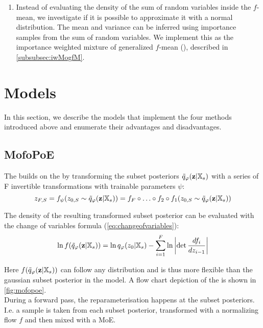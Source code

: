 \begin{enumerate}
    \item Instead of evaluating the density of the sum of random variables inside the $f$-mean, we investigate if it is possible to approximate it with a normal distribution.
    The mean and variance can be inferred using importance samples from the sum of random variables.
    We implement this as the importance weighted mixture of generalized $f$-mean (), described in \cref{subsubsec:iwMogfM}.

\end{enumerate}


\section{Models}
In this section, we describe the models that implement the four methods introduced above and enumerate their advantages and disadvantages.

\subsection{MofoPoE}\label{subsec:mofopoe}
The  builds on the  by transforming the subset posteriors $\tilde{q}_{\varphi}(\textbf{z}|\mathbb{X}_s)$ with a series of F invertible transformations with trainable parameters $\psi$:
\begin{equation}
    z_{F,S} =f_{\psi}(z_{0,S} \sim \tilde{q}_{\varphi}(\textbf{z}|\mathbb{X}_s)) = f_F \circ \ldots \circ f_2 \circ f_1(z_{0,S} \sim \tilde{q}_{\varphi}(\textbf{z}|\mathbb{X}_s))
\end{equation}

The density of the resulting transformed subset posterior can be evaluated with the change of variables formula (\cref{eq:changeofvariables}):
\begin{equation}
    \label{eq:changeofvariables_}
    \ln f(\tilde{q}_{\varphi}(\textbf{z}|\mathbb{X}_s)) = \ln q_{\varphi} (z_0|\mathbb{X}_s) - \sum _{i=1} ^{F}\ln \left|  \det \frac{df_i}{dz_{i-1}}\right|
\end{equation}

Here $f(\tilde{q}_{\varphi}(\textbf{z}|\mathbb{X}_s))$ can follow any distribution and is thus more flexible than the gaussian subset posterior in the  model.
A flow chart depiction of the  is shown in \cref{fig:mofopoe}.\\
During a forward pass, the reparameterisation happens at the subset posteriors.
I.e. a sample is taken from each subset posterior, transformed with a normalizing flow $f$ and then mixed with a MoE.

